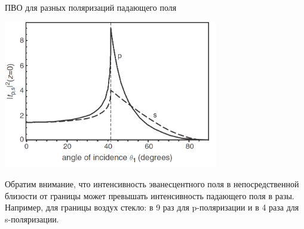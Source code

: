 \documentclass[9pt, compress, xcolor=table]{beamer}
\begin{document}
\begin{frame}{ПВО для разных поляризаций падающего поля}
\begin{center}
\includegraphics[width=0.7\textwidth]{ftir}
\end{center}

Обратим внимание, что интенсивность эванесцентного поля в непосредственной близости от границы может превышать интенсивность падающего поля в разы. Например, для границы воздух стекло: в 9 раз для p-поляризации и в 4 раза для s-поляризации.

\end{frame}
\end{document}
